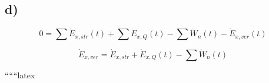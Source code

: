 

\subsection*{d)}

\[
0 = \sum \dot{E}_{x,str}(t) + \sum \dot{E}_{x,Q}(t) - \sum \dot{W}_n(t) - \dot{E}_{x,ver}(t)
\]

\[
\dot{E}_{x,ver} = \dot{E}_{x,str} + \dot{E}_{x,Q}(t) - \sum \dot{W}_n(t)
\]

``````latex